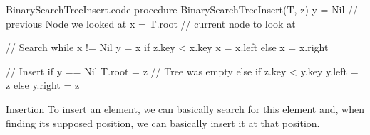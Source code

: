 \documentclass[a4paper]{article}
\begin{document}
\begin{filecontents*}[overwrite]{BinarySearchTreeInsert.code}
procedure BinarySearchTreeInsert(T, z)
    y = Nil  // previous Node we looked at
    x = T.root  // current node to look at
    
    // Search
    while x != Nil
        y = x
        if z.key < x.key
            x = x.left
        else
            x = x.right

    // Insert
    if y == Nil
        T.root = z  // Tree was empty
    else if z.key < y.key
        y.left = z
    else
        y.right = z
\end{filecontents*}

\begin{parag}{Insertion}
    To insert an element, we can basically search for this element and, when finding its supposed position, we can basically insert it at that position.

\end{parag}
\end{document}
